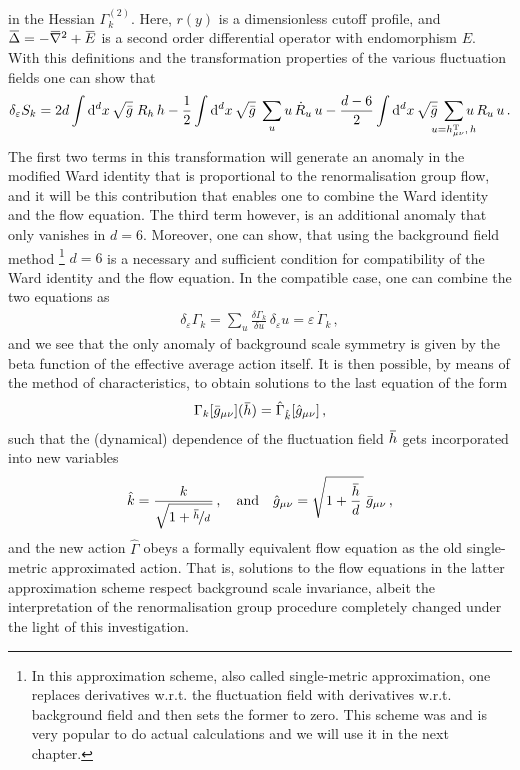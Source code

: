 \documentclass[11pt]{book}
\newcommand{\overbar}[1]{\mkern 1.5mu\overline{\mkern-1.5mu#1\mkern-1.5mu}\mkern 1.5mu}
\newcommand\hT{ h^{\scriptscriptstyle{\mathrm{T}} } }
\newcommand{\bnabla}{\overbar \nabla}
\newcommand{\weyl}{\delta_\varepsilon}
\numberwithin{equation}{chapter}
\begin{document}
in the Hessian $\Gamma^{(2)}_k$. Here, $r(y)$ is a dimensionless cutoff profile, and
$\overbar \Delta = -\bnabla^2 + \overbar E$ is a second order differential operator with
endomorphism $E$. With this definitions and the transformation properties of the various
fluctuation fields one can show that
\begin{align}
  \weyl S_k =
  2d \int \mathrm d^dx \, \sqrt{\bar g} \; R_h \, h
  - \frac 12 \int \mathrm d^dx \, \sqrt{\bar g} \; \sum_u u \, \dot R_u \, u
  - \frac {d-6}2 \int \mathrm d^dx \, \sqrt{\bar g} \;
  \smashoperator{\sum_{u=\hT_{\mu\nu},\,h}} u \, R_u \, u \,.
\end{align}
The first two terms in this transformation will generate an anomaly in the modified Ward
identity that is proportional to the renormalisation group flow, and it will be this
contribution that enables one to combine the Ward identity and the flow equation. The
third term however, is an additional anomaly that only vanishes in $d=6$. Moreover,
one can show, that using the background field method%
\footnote{%
  In this approximation scheme, also called single-metric approximation, one
  replaces derivatives w.r.t. the fluctuation field with derivatives w.r.t. background
  field and then sets the former to zero. This scheme was and is very popular
  to do actual calculations and we will use it in the next chapter.
}
$d=6$ is a necessary and sufficient condition for compatibility of the Ward identity and
the flow equation.
In the compatible case, one can combine the two equations as
\begin{align}
  \weyl \Gamma_k = \sum_u \frac{ \delta \Gamma_k }{ \delta u } \, \weyl u
  = \varepsilon \, \dot \Gamma_k \,,
\end{align}
and we see that the only anomaly of background scale symmetry is given by the
beta function of the effective average action itself.
It is then possible, by means of the method of characteristics, to obtain
solutions to the last equation of the form
\begin{align}
  \Gamma_k [ \bar g_{\mu\nu} ] (\overbar h) =
  \hat \Gamma_{\hat k} [ \hat g_{\mu\nu} ] \,,
\end{align}
such that the (dynamical) dependence of the fluctuation field $\overbar h$
gets incorporated into new variables
\begin{align}
  \hat k = \frac{ k }{ \sqrt{ 1 + \nicefrac{ \overbar h }{d} \, }} \,,
  \quad \text{and} \quad
  \hat g_{\mu\nu} = \sqrt{ 1 + \frac{ \overbar h }{d} \, } \,
  \bar g_{\mu\nu} \,,
\end{align}
and the new action $\hat \Gamma$ obeys a formally equivalent flow equation
as the old single-metric approximated action. That is, solutions to the flow
equations in the latter approximation scheme respect background scale invariance,
albeit the interpretation of the renormalisation group procedure completely
changed under the light of this investigation.
\end{document}
